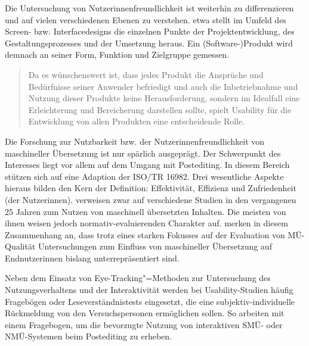 Die Untersuchung von Nutzer{\textperiodcentered}innenfreundlichkeit ist weiterhin zu differenzieren und auf vielen verschiedenen Ebenen zu verstehen. \citet[]{stapelkamp_screen-_2007} etwa stellt im Umfeld des Screen- bzw. Interfacedesigns die einzelnen Punkte der Projektentwicklung, des Gestaltungsprozesses und der Umsetzung heraus. Ein (Software-)Produkt wird demnach an seiner Form, Funktion und Zielgruppe gemessen.

\begin{quote}
    Da es wünschenswert ist, dass jedes Produkt die Ansprüche und Bedürfnisse seiner Anwender befriedigt und auch die Inbetriebnahme und Nutzung dieser Produkte keine Herausforderung, sondern im Idealfall eine Erleichterung und Bereicherung darstellen sollte, spielt Usability für die Entwicklung von allen Produkten eine entscheidende Rolle. \citep[514]{stapelkamp_screen-_2007}
\end{quote}

Die Forschung zur Nutzbarkeit bzw. der Nutzer{\textperiodcentered}innenfreundlichkeit von maschineller Übersetzung ist nur spärlich ausgeprägt. Der Schwerpunkt des Interesses liegt vor allem auf dem Umgang mit Postediting. In diesem Bereich stützen sich \citeauthor{castilho_evaluating_2016} auf eine Adaption der ISO/TR 16982. Drei wesentliche Aspekte hieraus bilden den Kern der Definition: Effektivität, Effizienz und Zufriedenheit (der Nutzer{\textperiodcentered}innen). \citet[310\psq]{castilho_evaluating_2016} verweisen zwar auf verschiedene Studien in den vergangenen 25 Jahren zum Nutzen von maschinell übersetzten Inhalten. Die meisten von ihnen weisen jedoch normativ-evaluierenden Charakter auf. \citet[79]{castilho_reading_2018} merken in diesem Zusammenhang an, dass trotz eines starken Fokusses auf der Evaluation von MÜ-Qualität Untersuchungen zum Einfluss von maschineller Übersetzung auf Endnutzer{\textperiodcentered}innen bislang unterrepräsentiert sind.

\begin{sloppypar}
Neben dem Einsatz von Eye-Tracking"=Methoden zur Untersuchung des Nutzungsverhaltens und der Interaktivität werden bei Usability-Studien häufig Fragebögen oder Leseverständnistests eingesetzt, die eine subjektiv-individuelle Rückmeldung von den Versuchspersonen ermöglichen sollen. So arbeiten \citet[128]{daems_interactive_2019} mit einem Fragebogen, um die bevorzugte Nutzung von interaktiven SMÜ- oder NMÜ-Systemen beim Postediting zu erheben.
\end{sloppypar}

